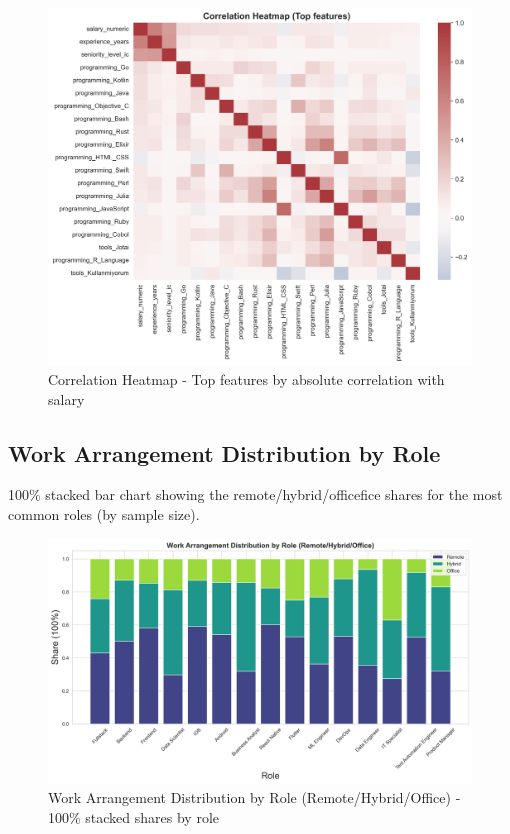 \documentclass[12pt,a4paper]{article}
\begin{document}
\begin{figure}[H]
    \centering
    \includegraphics[width=\textwidth]{figures/heatmap_correlation.png}
    \caption{Correlation Heatmap - Top features by absolute correlation with salary}
\end{figure}

\subsection{Work Arrangement Distribution by Role}

100\% stacked bar chart showing the remote/hybrid/officefice shares for the most common roles (by sample size).

\begin{figure}[H]
    \centering
    \includegraphics[width=\textwidth]{figures/barplot_work_arrangement_by_role.png}
    \caption{Work Arrangement Distribution by Role (Remote/Hybrid/Office) - 100\% stacked shares by role}
\end{figure}
\end{document}
